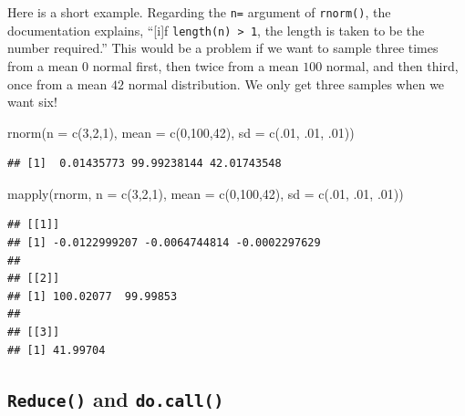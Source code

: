 \documentclass[
  12pt,
  krantz2]{krantz}
\makeatletter
\newenvironment{Shaded}{\begin{snugshade}}{\end{snugshade}}
\newcommand{\AttributeTok}[1]{\textcolor[rgb]{0.61,0.61,0.61}{#1}}
\newcommand{\DecValTok}[1]{\textcolor[rgb]{0.06,0.06,0.06}{#1}}
\newcommand{\FunctionTok}[1]{\textcolor[rgb]{0,0,0}{#1}}
\newcommand{\NormalTok}[1]{#1}
\newenvironment{kframe}{%
\medskip{}
\setlength{\fboxsep}{.8em}
 \def\at@end@of@kframe{}%
 \ifinner\ifhmode%
  \def\at@end@of@kframe{\end{minipage}}%
  \begin{minipage}{\columnwidth}%
 \fi\fi%
 \def\FrameCommand##1{\hskip\@totalleftmargin \hskip-\fboxsep
 \colorbox{shadecolor}{##1}\hskip-\fboxsep
     \hskip-\linewidth \hskip-\@totalleftmargin \hskip\columnwidth}%
 \MakeFramed {\advance\hsize-\width
   \@totalleftmargin\z@ \linewidth\hsize
   \@setminipage}}%
 {\par\unskip\endMakeFramed%
 \at@end@of@kframe}
\renewenvironment{Shaded}{\begin{kframe}}{\end{kframe}}
\makeatother
\begin{document}
Here is a short example. Regarding the \texttt{n=} argument of \texttt{rnorm()}, the documentation explains, ``{[}i{]}f \texttt{length(n)\ \textgreater{}\ 1}, the length is taken to be the number required.'' This would be a problem if we want to sample three times from a mean \(0\) normal first, then twice from a mean \(100\) normal, and then third, once from a mean \(42\) normal distribution. We only get three samples when we want six!

\begin{Shaded}
\begin{Highlighting}[]
\FunctionTok{rnorm}\NormalTok{(}\AttributeTok{n =} \FunctionTok{c}\NormalTok{(}\DecValTok{3}\NormalTok{,}\DecValTok{2}\NormalTok{,}\DecValTok{1}\NormalTok{), }\AttributeTok{mean =} \FunctionTok{c}\NormalTok{(}\DecValTok{0}\NormalTok{,}\DecValTok{100}\NormalTok{,}\DecValTok{42}\NormalTok{), }\AttributeTok{sd =} \FunctionTok{c}\NormalTok{(.}\DecValTok{01}\NormalTok{, .}\DecValTok{01}\NormalTok{, .}\DecValTok{01}\NormalTok{))}
\end{Highlighting}
\end{Shaded}

\begin{verbatim}
## [1]  0.01435773 99.99238144 42.01743548
\end{verbatim}

\begin{Shaded}
\begin{Highlighting}[]
\FunctionTok{mapply}\NormalTok{(rnorm, }\AttributeTok{n =} \FunctionTok{c}\NormalTok{(}\DecValTok{3}\NormalTok{,}\DecValTok{2}\NormalTok{,}\DecValTok{1}\NormalTok{), }\AttributeTok{mean =} \FunctionTok{c}\NormalTok{(}\DecValTok{0}\NormalTok{,}\DecValTok{100}\NormalTok{,}\DecValTok{42}\NormalTok{), }\AttributeTok{sd =} \FunctionTok{c}\NormalTok{(.}\DecValTok{01}\NormalTok{, .}\DecValTok{01}\NormalTok{, .}\DecValTok{01}\NormalTok{))}
\end{Highlighting}
\end{Shaded}

\begin{verbatim}
## [[1]]
## [1] -0.0122999207 -0.0064744814 -0.0002297629
## 
## [[2]]
## [1] 100.02077  99.99853
## 
## [[3]]
## [1] 41.99704
\end{verbatim}

\hypertarget{reduce-and-do.call}{%
\subsection{\texorpdfstring{\texttt{Reduce()} and \texttt{do.call()}}{Reduce() and do.call()}}\label{reduce-and-do.call}}
\end{document}
